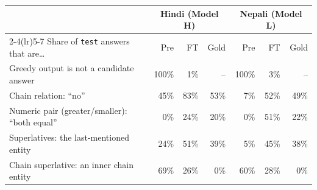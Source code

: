 \begin{tabular}{lrrrrrr}
\toprule
& \multicolumn{3}{c}{Hindi (Model H)} & \multicolumn{3}{c}{Nepali (Model L)} \\
\cmidrule(lr){2-4}\cmidrule(lr){5-7}
Share of \texttt{test} answers that are\ldots & Pre & FT & Gold & Pre & FT & Gold \\
\midrule
Greedy output is not a candidate answer & 100\% & 1\% & -- & 100\% & 3\% & -- \\
Chain relation: ``no'' & 45\% & 83\% & 53\% & 7\% & 52\% & 49\% \\
Numeric pair (greater/smaller): ``both equal'' & 0\% & 24\% & 20\% & 0\% & 51\% & 22\% \\
Superlatives: the last-mentioned entity & 24\% & 51\% & 39\% & 5\% & 45\% & 38\% \\
Chain superlative: an inner chain entity & 69\% & 26\% & 0\% & 60\% & 28\% & 0\% \\
\bottomrule
\end{tabular}
